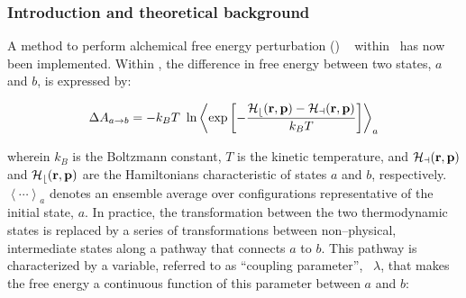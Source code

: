 





\subsubsection{Introduction and theoretical background}


A method to perform alchemical free energy perturbation (\FEP)
~\cite{zwan_54_1,Beveridge.89,Gunsteren.89,Straatsma.92,Kollman.93,Gilson.97,
Mark.98,chip_01_1} within \NAMD\ has now been implemented. 
Within \FEP, the difference in free energy between two states,
$a$ and $b$, is expressed by:

\begin{equation}
\Delta A_{a \rightarrow b} = -k_B T \ \ln
\left< \exp\left[-\frac{\cal H_b({\bf r}, {\bf p}) - 
                         \cal H_a({\bf r}, {\bf p})}
                        {k_B T}\right]
\right>_a
\end{equation}

wherein $k_B$ is the Boltzmann constant, $T$ is the kinetic temperature,
and $\cal H_a({\bf r}, {\bf p})$ and $\cal H_b({\bf r}, {\bf p})$
are the Hamiltonians characteristic of states $a$ and $b$, respectively.
$\left< \cdots \right>_a$ denotes an ensemble average over configurations
representative of the initial state, $a$.
In practice, the transformation between the two thermodynamic states
is replaced by a series of transformations between non--physical,
intermediate states along a pathway that connects $a$ to $b$.
This pathway is characterized by a variable, referred to as
``coupling parameter'',~\cite{Beveridge.89,Mark.98,king_93_1} 
$\lambda$, that makes the free energy
a continuous function of this parameter between $a$ and $b$:

